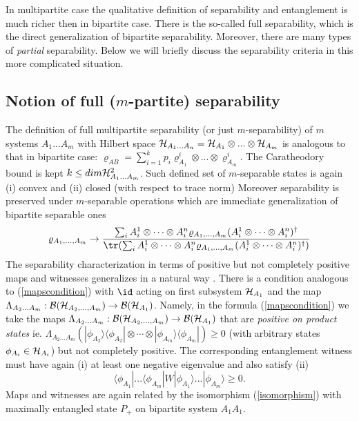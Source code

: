 \documentclass[rmp,12pt,preprint]{revtex4-2}
\begin{document}
In multipartite case the qualitative definition of separability and
entanglement is much richer then in bipartite case. There is the
so-called full separability, which is the direct generalization of
bipartite separability. Moreover, there are many types of {\it
  partial} separability. Below we will briefly discuss the
separability criteria in this more complicated situation.


\subsection{Notion of full ($m$-partite) separability }
\label{sec:full-sep}

The definition of full multipartite separability (or just
$m$-separability) of $m$ systems $A_{1}...A_{m}$ with Hilbert space
${\cal H}_{A_{1}...A_{n}}= {\cal H}_{A_{1}} \otimes ... \otimes {\cal
  H}_{A_{m}}$ is analogous to that in bipartite case: $\varrho_{AB} =
\sum_{i=1}^{k} p_{i} \varrho_{A_1}^{i} \otimes ...\otimes
\varrho_{A_{m}}^{i}$. The Caratheodory bound is kept $k\leq dim {\cal
  H}_{A_{1}...A_{m}}^{2}$.  Such defined set of $m$-separable states
is again (i) convex and (ii) closed (with respect to trace norm)
Moreover separability is preserved under $m$-separable operations
which are immediate generalization of bipartite separable ones
\begin{equation}
\varrho_{A_1,\ldots,A_{m}} \rightarrow {\sum_{i} A_{i}^{1} \otimes \cdots
\otimes A^{n}_{i} \varrho_{A_{1},\ldots,A_{m}} (A_{i}^{1} \otimes \cdots
\otimes A^{n}_{i})^{\dagger}\over  \tr(\sum_{i} A_{i}^{1} \otimes \cdots
\otimes A^{n}_{i} \varrho_{A_{1},\ldots,A_{m}} (A_{i}^{1} \otimes \cdots
\otimes A^{n}_{i})^{\dagger})}
\end{equation}
The separability characterization in terms of positive but not
completely positive maps and witnesses generalizes in a natural way
\cite{multisep}. There is a condition analogous to
(\ref{mapscondition}) with $\id$ acting on first subsystem ${\cal
  H}_{A_{1}}$ and the map $\Lambda_{A_{2}...A_{m}}: {\cal B}({\cal
  H}_{A_{2},\ldots,A_{m}})\rightarrow {\cal B}({\cal
  H}_{A_{1}})$. Namely, in the formula (\ref{mapscondition}) we take
the maps $\Lambda_{A_{2}...A_{m}}: {\cal B}({\cal
  H}_{A_{2},\ldots,A_{m}}) \rightarrow {\cal B}({\cal H}_{A_{1}})$
that are {\it positive on product states}
ie. $\Lambda_{A_{2}...A_{m}}(|\phi_{A_{2}}\rangle \langle \phi_{A_{2}}
| \otimes \cdots \otimes |\phi_{A_{m}}\rangle \langle
\phi_{A_{m}}|)\geq 0$ (with arbitrary states $\phi_{A_{i}}\in {\cal
  H}_{A_{i}}$) but not completely positive. The corresponding
entanglement witness must have again (i) at least one negative
eigenvalue and also satisfy (ii)
\begin{equation}
\langle \phi_{A_{1}}| ...\langle \phi_{A_{m}}| W
|\phi_{A_{1}}\rangle ...|\phi_{A_{m}}\rangle \geq 0.
\label{witnesscondition(m)}
\end{equation}
Maps and witnesses are again related by the isomorphism
(\ref{isomorphism}) with maximally entangled state $P_{+}$ on
bipartite system $A_{1}A_{1}$.
\end{document}
